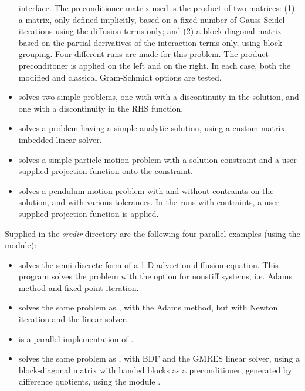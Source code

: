 \begin{itemize}
  {\cvls} interface.
  \newline
  The preconditioner matrix used is the product of two matrices:
  (1) a matrix, only defined implicitly, based on a fixed number of
  Gauss-Seidel iterations using the diffusion terms only; and
  (2) a block-diagonal matrix based on the partial derivatives of the
  interaction terms only, using block-grouping.
  \newline
  Four different runs are made for this problem.
  The product preconditoner is applied on the left and on the right.
  In each case, both the modified and classical Gram-Schmidt options
  are tested.
\item {} solves two simple problems, one with with a
  discontinuity in the solution, and one with a discontinuity in the
  RHS function.
\item {} solves a problem having a simple analytic
  solution, using a custom matrix-imbedded linear solver.
\item {} solves a simple particle motion problem
  with a solution constraint and a user-supplied projection function
  onto the constraint.
\item {} solves a pendulum motion problem with and
  without contraints on the solution, and with various tolerances.  In the
  runs with contraints, a user-supplied projection function is applied.
\end{itemize}

\vspace{0.2in}\noindent Supplied in the
{\em srcdir} directory are the following
four parallel examples (using the {\nvecp} module):
\begin{itemize}
\item {} solves the semi-discrete form of a 1-D
  advection-diffusion equation.
  \newline
  This program solves the problem with the option for nonstiff
  systems, i.e. Adams method and fixed-point iteration.
\item {}
  solves the same problem as , with the Adams method,
  but with Newton iteration and the  linear solver.
\item {}
  is a parallel implementation of .
\item {}
  solves the same problem as , with BDF and the GMRES linear
  solver, using a block-diagonal matrix with banded blocks as a preconditioner,
  generated by difference quotients, using the module {\cvbbdpre}.
\end{itemize}


